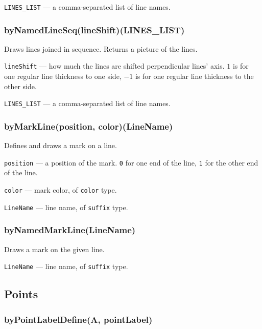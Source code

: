 \documentclass{ltxdoc}
\begin{document}
	\texttt{LINES\_LIST} — a comma-separated list of line names.

\subsubsection{byNamedLineSeq(lineShift)(LINES\_LIST)}\label{byNamedLineSeq}
	
	Draws lines joined in sequence. Returns a picture of the lines.
	
	\texttt{lineShift} — how much the lines are shifted perpendicular lines' axis. \texttt{$1$} is for one regular line thickness to one side, \texttt{$-1$} is for one regular line thickness to the other side.
	
	\texttt{LINES\_LIST} — a comma-separated list of line names.

\subsubsection{byMarkLine(position, color)(LineName)}\label{byMarkLine}

	Defines and draws a mark on a line.
	
	\texttt{position} — a position of the mark. \texttt{0} for one end of the line, \texttt{1} for the other end of the line.
	
	\texttt{color} — mark color, of \texttt{color} type.
	
	\texttt{LineName} — line name, of \texttt{suffix} type.

\subsubsection{byNamedMarkLine(LineName)}

	Draws a mark on the given line.
	
	\texttt{LineName} — line name, of \texttt{suffix} type.
	

\subsection{Points}

\subsubsection{byPointLabelDefine(A, pointLabel)}\label{byPointLabelDefine}
\end{document}
